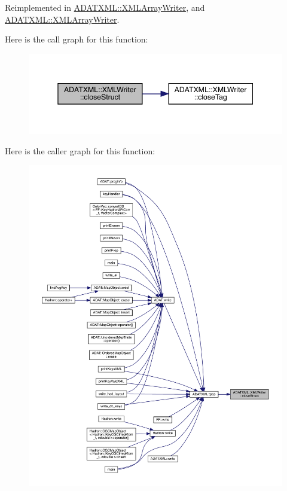 Reimplemented in \mbox{\hyperlink{classADATXML_1_1XMLArrayWriter_a5a849f8851bce99654c44dc08b1fe486}{A\+D\+A\+T\+X\+M\+L\+::\+X\+M\+L\+Array\+Writer}}, and \mbox{\hyperlink{classADATXML_1_1XMLArrayWriter_a5a849f8851bce99654c44dc08b1fe486}{A\+D\+A\+T\+X\+M\+L\+::\+X\+M\+L\+Array\+Writer}}.

Here is the call graph for this function\+:\nopagebreak
\begin{figure}[H]
\begin{center}
\leavevmode
\includegraphics[width=345pt]{da/da7/classADATXML_1_1XMLWriter_ade5512a07806893fe3aaebb897580569_cgraph}
\end{center}
\end{figure}
Here is the caller graph for this function\+:\nopagebreak
\begin{figure}[H]
\begin{center}
\leavevmode
\includegraphics[width=350pt]{da/da7/classADATXML_1_1XMLWriter_ade5512a07806893fe3aaebb897580569_icgraph}
\end{center}
\end{figure}
\mbox{\label{classADATXML_1_1XMLWriter_abef3ef70df40a5e9e71c99c56f133589}} 
